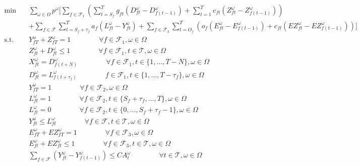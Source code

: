 \documentclass[12pt]{article}
\begin{document}
	\begin{subequations}
		\begin{align}
			\min \quad & \sum_{\omega \in \Omega} p^\omega \bigg[ \sum_{f \in \mathcal{F}_1} \left(\sum_{t = S_f}^T g_{ft}(D_{ft}^\omega - D_{f(t-1)}^\omega) + \sum_{t = 1}^T c_{ft}(Z_{ft}^\omega - Z_{f(t-1)}^\omega) \right) \nonumber\\
			& +\sum_{f \in \mathcal{F}}\sum_{t = S_f+\tau_f}^T a_{f}(L_{ft}^\omega - Y_{ft}^\omega) + \sum_{f \in \mathcal{F}_3} \sum_{t = O_f}^{T} \left(o_{f}(E_{ft}^\omega - E_{f(t-1)}^\omega) + c_{ft}(EZ_{ft}^\omega - EZ_{f(t-1)}^\omega)\right) \bigg]\\
			\text{s.t.} \quad &  Y_{fT}^\omega + Z_{fT}^\omega = 1 \qquad \qquad \forall f \in \mathcal{F}_1, \omega \in \Omega \label{cancelORfly}\\
			& Z_{ft}^\omega + D_{ft}^\omega \leq 1 \qquad \qquad \forall f \in \mathcal{F}_1, t \in \mathcal{T}, \omega \in \Omega \label{cancelORplan}\\
			& X_{ft}^\omega = D_{f(t+N)}^\omega \qquad \qquad \forall f \in \mathcal{F}_1, t \in \{1, \dots, T-N\}, \omega \in \Omega \label{planahead}\\
			& D_{ft}^\omega = L_{f(t + \tau_f)}^\omega \qquad \qquad f \in \mathcal{F}_1, t \in \{1, \dots, T - \tau_{f}\}, \omega \in \Omega \label{depLag}\\
			& Y_{fT}^\omega = 1 \qquad \qquad \forall f \in \mathcal{F}_2, \omega \in \Omega \label{mustLand}\\
			& L_{ft}^\omega = 1 \qquad \qquad \forall f \in \mathcal{F}_2, t \in \{S_f+\tau_f, \dots, T\}, \omega \in \Omega \label{mustArr}\\
			& L_{ft}^\omega = 0 \qquad \qquad \forall f \in \mathcal{F}_2, t \in \{0, \dots, S_f+\tau_f-1\}, \omega \in \Omega \label{cannotArr}\\
			& Y_{ft}^\omega \leq L_{ft}^\omega \qquad \qquad \forall f \in \mathcal{F}, t \in \mathcal{T}, \omega \in \Omega \label{arrland}\\
			& E_{fT}^\omega + EZ_{fT}^\omega = 1 \qquad \qquad \forall f \in \mathcal{F}_3, \omega \in \Omega \label{cancelORto}\\
			& E_{ft}^\omega + EZ_{ft}^\omega \leq 1 \qquad \qquad \forall f \in \mathcal{F}_3, t \in \mathcal{T}, \omega \in \Omega \label{cancelTO2}\\
			& \sum_{f \in \mathcal{F}}\left(Y_{ft}^\omega - Y_{f(t-1)}^\omega\right) \leq CA_{t}^\omega \qquad \qquad \forall t \in \mathcal{T}, \omega \in \Omega \label{arrCap}\\

\end{align}
\end{subequations}
\end{document}
